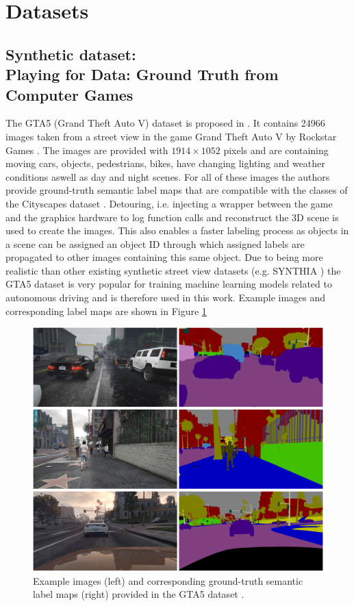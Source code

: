 \section{Datasets}

\subsection{Synthetic dataset: \\
	Playing for Data: Ground Truth from Computer Games}

The GTA5 (Grand Theft Auto V) dataset is proposed in \cite{Richter_2016_ECCV}. It contains 24966 images taken from a street view in the game Grand Theft Auto V by Rockstar Games \cite{GTAV}. The images are provided with $1914 \times 1052$ pixels and are containing moving cars, objects, pedestrians, bikes, have changing lighting and weather conditions aswell as day and night scenes. For all of these images the authors provide ground-truth semantic label maps that are compatible with the classes of the Cityscapes dataset \cite{Cordts_2016_CVPR}. Detouring, i.e. injecting a wrapper between the game and the graphics hardware to log function calls and reconstruct the 3D scene is used to create the images. This also enables a faster labeling process as objects in a scene can be assigned an object ID through which assigned labels are propagated to other images containing this same object. Due to being more realistic than other existing synthetic street view datasets (e.g. SYNTHIA \cite{RosCVPR16}) the GTA5 dataset is very popular for training machine learning models related to autonomous driving and is therefore used in this work. Example images and corresponding label maps are shown in Figure \ref{fig:p4d_examples} 


\begin{figure}
	\centering
	\includegraphics[width=\textwidth]{images/p4d_example.png}
	\caption{Example images (left) and corresponding ground-truth semantic label maps (right) provided in the GTA5 dataset \cite{Richter_2016_ECCV}.}
	\label{fig:p4d_examples}
\end{figure}

